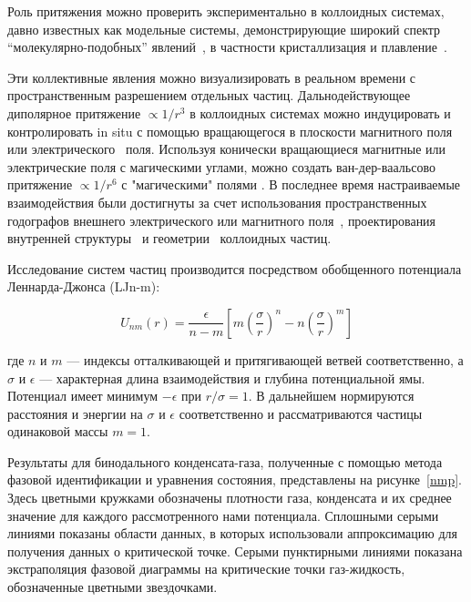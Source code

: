 Роль притяжения можно проверить экспериментально в коллоидных системах, давно известных как модельные системы, демонстрирующие широкий спектр ``молекулярно-подобных'' явлений~\cite{book.fernandez, book.ivlev, 10.1016/0370-1573(94)90017-5, 10.1038/natrevmats.2015.11, 10.1039/c9sm01953g}, в частности кристаллизация и плавление~\cite{10.1126/science.1112399, 10.1039/c2sm26473k, 10.1103/physrevlett.82.2721, 10.1103/physrevlett.85.3656, 10.1103/physrevlett.118.088003, 10.1039/c2sm27654b, 10.1126/science.1224763, 10.1038/s41598-021-97124-7}.

Эти коллективные явления можно визуализировать в реальном времени с пространственным разрешением отдельных частиц. Дальнодействующее диполярное притяжение $\propto 1/r^3$ в коллоидных системах можно индуцировать и контролировать in situ с помощью вращающегося в плоскости магнитного поля~\cite{10.1088/0034-4885/76/12/126601, 10.1039/c3sm50306b, 10.1039/c3sm27620a, 10.1103/physrevmaterials.2.025602} или электрического~\cite{10.1088/1367-2630/8/11/267, 10.1063/1.3115641, 10.1021/la2014804, 10.1021/la500178b, 10.1039/c1sm06414b, 10.1038/s41598-017-14001-y} поля.
Используя конически вращающиеся магнитные или электрические поля с магическими углами, можно создать ван-дер-ваальсово притяжение $\propto 1/r^6$ с "магическими" полями \cite{10.1021/la500896e, 10.1103/physrevlett.103.228301}.
В последнее время настраиваемые взаимодействия были достигнуты за счет использования пространственных годографов внешнего электрического или магнитного поля~\cite{10.1039/d0sm01046d}, проектирования внутренней структуры~\cite{10.1063/5.0055566} и геометрии~\cite{10.1063/5.0060705} коллоидных частиц.

Исследование систем частиц производится посредством обобщенного потенциала Леннарда-Джонса (LJn-m):

\begin{equation}
U_{n m}(r)=\frac{\epsilon}{n-m}\left[m\left(\frac{\sigma}{r}\right)^{n}-n\left(\frac{\sigma}{r}\right)^{m}\right]
\end{equation}

где $n$ и $m$ — индексы отталкивающей и притягивающей ветвей соответственно, а $\sigma$ и $\epsilon$ — характерная длина взаимодействия и глубина потенциальной ямы. Потенциал имеет минимум $-\epsilon$ при $r/\sigma=1$. В дальнейшем нормируются расстояния и энергии на $\sigma$ и $\epsilon$ соответственно и рассматриваются частицы одинаковой массы $m=1$.

Результаты для бинодального конденсата-газа, полученные с помощью метода фазовой идентификации и уравнения состояния, представлены на рисунке~\ref{nmp}. Здесь цветными кружками обозначены плотности газа, конденсата и их среднее значение для каждого рассмотренного нами потенциала. Сплошными серыми линиями показаны области данных, в которых использовали аппроксимацию для получения данных о критической точке. Серыми пунктирными линиями показана экстраполяция фазовой диаграммы на критические точки газ-жидкость, обозначенные цветными звездочками.

